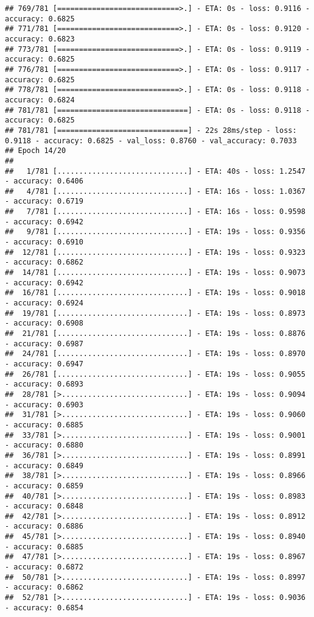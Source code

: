 \documentclass[
]{article}
\begin{document}
\begin{verbatim}
## 769/781 [============================>.] - ETA: 0s - loss: 0.9116 - accuracy: 0.6825
## 771/781 [============================>.] - ETA: 0s - loss: 0.9120 - accuracy: 0.6823
## 773/781 [============================>.] - ETA: 0s - loss: 0.9119 - accuracy: 0.6825
## 776/781 [============================>.] - ETA: 0s - loss: 0.9117 - accuracy: 0.6825
## 778/781 [============================>.] - ETA: 0s - loss: 0.9118 - accuracy: 0.6824
## 781/781 [==============================] - ETA: 0s - loss: 0.9118 - accuracy: 0.6825
## 781/781 [==============================] - 22s 28ms/step - loss: 0.9118 - accuracy: 0.6825 - val_loss: 0.8760 - val_accuracy: 0.7033
## Epoch 14/20
## 
##   1/781 [..............................] - ETA: 40s - loss: 1.2547 - accuracy: 0.6406
##   4/781 [..............................] - ETA: 16s - loss: 1.0367 - accuracy: 0.6719
##   7/781 [..............................] - ETA: 16s - loss: 0.9598 - accuracy: 0.6942
##   9/781 [..............................] - ETA: 19s - loss: 0.9356 - accuracy: 0.6910
##  12/781 [..............................] - ETA: 19s - loss: 0.9323 - accuracy: 0.6862
##  14/781 [..............................] - ETA: 19s - loss: 0.9073 - accuracy: 0.6942
##  16/781 [..............................] - ETA: 19s - loss: 0.9018 - accuracy: 0.6924
##  19/781 [..............................] - ETA: 19s - loss: 0.8973 - accuracy: 0.6908
##  21/781 [..............................] - ETA: 19s - loss: 0.8876 - accuracy: 0.6987
##  24/781 [..............................] - ETA: 19s - loss: 0.8970 - accuracy: 0.6947
##  26/781 [..............................] - ETA: 19s - loss: 0.9055 - accuracy: 0.6893
##  28/781 [>.............................] - ETA: 19s - loss: 0.9094 - accuracy: 0.6903
##  31/781 [>.............................] - ETA: 19s - loss: 0.9060 - accuracy: 0.6885
##  33/781 [>.............................] - ETA: 19s - loss: 0.9001 - accuracy: 0.6880
##  36/781 [>.............................] - ETA: 19s - loss: 0.8991 - accuracy: 0.6849
##  38/781 [>.............................] - ETA: 19s - loss: 0.8966 - accuracy: 0.6859
##  40/781 [>.............................] - ETA: 19s - loss: 0.8983 - accuracy: 0.6848
##  42/781 [>.............................] - ETA: 19s - loss: 0.8912 - accuracy: 0.6886
##  45/781 [>.............................] - ETA: 19s - loss: 0.8940 - accuracy: 0.6885
##  47/781 [>.............................] - ETA: 19s - loss: 0.8967 - accuracy: 0.6872
##  50/781 [>.............................] - ETA: 19s - loss: 0.8997 - accuracy: 0.6862
##  52/781 [>.............................] - ETA: 19s - loss: 0.9036 - accuracy: 0.6854

\end{verbatim}
\end{document}
